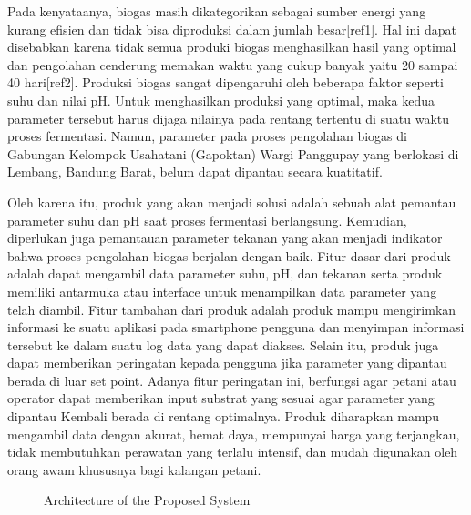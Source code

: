 \documentclass[conference]{IEEEtran}
\begin{document}
Pada kenyataanya, biogas masih dikategorikan sebagai sumber energi yang kurang efisien dan tidak bisa diproduksi dalam jumlah besar[ref1]. Hal ini dapat disebabkan karena tidak semua produki biogas menghasilkan hasil yang optimal dan pengolahan cenderung memakan waktu yang cukup banyak yaitu 20 sampai 40 hari[ref2]. Produksi biogas sangat dipengaruhi oleh beberapa faktor seperti suhu dan nilai pH. Untuk menghasilkan produksi yang optimal, maka kedua parameter tersebut harus dijaga nilainya pada rentang tertentu di suatu waktu proses fermentasi. Namun, parameter pada proses pengolahan biogas di Gabungan Kelompok Usahatani (Gapoktan) Wargi Panggupay yang berlokasi di Lembang, Bandung Barat, belum dapat dipantau secara kuatitatif.   

Oleh karena itu, produk yang akan menjadi solusi adalah sebuah alat pemantau parameter suhu dan pH saat proses fermentasi berlangsung. Kemudian, diperlukan juga pemantauan parameter tekanan yang akan menjadi indikator bahwa proses pengolahan biogas berjalan dengan baik. Fitur dasar dari produk adalah dapat mengambil data parameter suhu, pH, dan tekanan serta produk memiliki antarmuka atau interface untuk menampilkan data parameter yang telah diambil. Fitur tambahan dari produk adalah produk mampu mengirimkan informasi ke suatu aplikasi pada smartphone pengguna dan menyimpan informasi tersebut ke dalam suatu log data yang dapat diakses. Selain itu, produk juga dapat memberikan peringatan kepada pengguna jika parameter yang dipantau berada di luar set point. Adanya fitur peringatan ini, berfungsi agar petani atau operator dapat memberikan input substrat yang sesuai agar parameter yang dipantau Kembali berada di rentang optimalnya. Produk diharapkan mampu mengambil data dengan akurat, hemat daya, mempunyai harga yang terjangkau, tidak membutuhkan perawatan yang terlalu intensif, dan mudah digunakan oleh orang awam khususnya bagi kalangan petani. 

\begin{figure}[ht!]
    \centering
    \def\svgwidth{\columnwidth}
    \scalebox{1.8}{}
    \caption{Architecture of the Proposed System}
    \label{fig1}
\end{figure}
\end{document}
